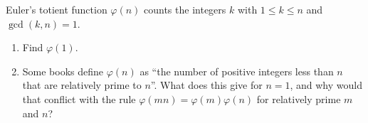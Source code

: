 Euler's totient function $\varphi(n)$ counts the integers $k$ with $1\le k\le n$ and $\gcd(k,n)=1$.
\begin{enumerate}
\item[(a)] Find $\varphi(1)$.
\item[(b)] Some books define $\varphi(n)$ as ``the number of positive integers less than $n$ that are relatively prime to $n$''. What does this give for $n=1$, and why would that conflict with the rule $\varphi(mn)=\varphi(m)\varphi(n)$ for relatively prime $m$ and $n$?
\end{enumerate}
